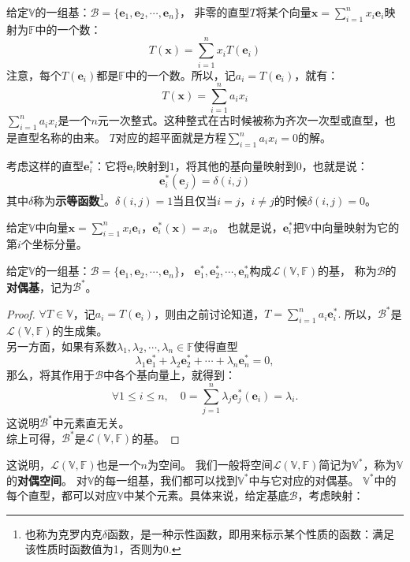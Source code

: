 \documentclass[12pt,UTF8,fontset=none]{ctexbook}
\begin{document}
给定$\mathbb{V}$的一组基：$\mathcal{B} = \{\mathbf{e}_1, \mathbf{e}_2, \cdots, \mathbf{e}_{n}\}$，
非零的直型$T$将某个向量$\mathbf{x} = \sum_{i=1}^n x_i \mathbf{e}_i$映射为$\mathbb{F}$中的一个数：
$$ T(\mathbf{x}) = \sum_{i=1}^n x_i T(\mathbf{e}_i)$$
注意，每个$T(\mathbf{e}_i)$都是$\mathbb{F}$中的一个数。所以，记$a_i = T(\mathbf{e}_i)$，就有：
$$ T(\mathbf{x}) = \sum_{i=1}^n a_i x_i$$
$\sum_{i=1}^n a_i x_i$是一个$n$元一次整式。这种整式在古时候被称为齐次一次型或直型，也是直型名称的由来。
$T$对应的超平面就是方程$ \sum_{i=1}^n a_i x_i = 0$的解。

考虑这样的直型$\mathbf{e}_i^*$：它将$\mathbf{e}_i$映射到$1$，将其他的基向量映射到$0$，也就是说：
$$ \mathbf{e}_i^*(\mathbf{e}_j) = \delta(i,j) $$
其中$\delta$称为\textbf{示等函数}\footnote{也称为克罗内克$\delta$函数，是一种示性函数，即用来标示某个性质的函数：满足该性质时函数值为1，否则为0.}。$\delta(i,j)=1$当且仅当$i=j$，$i\neq j$的时候$\delta(i,j)=0$。

给定$\mathbb{V}$中向量$\mathbf{x} = \sum_{i=1}^n x_i \mathbf{e}_i$，$\mathbf{e}_i^*(\mathbf{x}) = x_i$。
也就是说，$\mathbf{e}_i^*$把$\mathbb{V}$中向量映射为它的第$i$个坐标分量。

\begin{pp}\label{pp:3_5_1}
给定$\mathbb{V}$的一组基：$\mathcal{B} = \{\mathbf{e}_1, \mathbf{e}_2, \cdots, \mathbf{e}_{n}\}$，
$\mathbf{e}_1^*, \mathbf{e}_2^*, \cdots , \mathbf{e}_n^*$构成$\mathcal{L}(\mathbb{V}, \mathbb{F})$的基，
称为$\mathcal{B}$的\textbf{对偶基}，记为$\mathcal{B}^*$。
\end{pp}
\begin{proof} %
$\forall T \in \mathbb{V}$，记$a_i = T(\mathbf{e}_i)$，则由之前讨论知道，$T = \sum_{i=1}^n a_i \mathbf{e}_i^*.$ 
所以，$\mathcal{B}^*$是$\mathcal{L}(\mathbb{V}, \mathbb{F})$的生成集。\\
另一方面，如果有系数$\lambda_1, \lambda_2, \cdots, \lambda_n \in \mathbb{F}$使得直型
$$ \lambda_1 \mathbf{e}_1^* + \lambda_2 \mathbf{e}_2^* + \cdots + \lambda_n \mathbf{e}_n^* = 0,$$
那么，将其作用于$\mathcal{B}$中各个基向量上，就得到：
$$ \forall 1 \leqslant i \leqslant n, \quad 0 = \sum_{j=1}^n \lambda_j \mathbf{e}_j^*(\mathbf{e}_i) = \lambda_i.$$
这说明$\mathcal{B}^*$中元素直无关。\\
综上可得，$\mathcal{B}^*$是$\mathcal{L}(\mathbb{V}, \mathbb{F})$的基。
\end{proof}


这说明，$\mathcal{L}(\mathbb{V}, \mathbb{F})$也是一个$n$为空间。
我们一般将空间$\mathcal{L}(\mathbb{V}, \mathbb{F})$简记为$\mathbb{V}^*$，称为$\mathbb{V}$的\textbf{对偶空间}。
对$\mathbb{V}$的每一组基，我们都可以找到$\mathbb{V}^*$中与它对应的对偶基。
$\mathbb{V}^*$中的每个直型，都可以对应$\mathbb{V}$中某个元素。具体来说，给定基底$\mathcal{B}$，考虑映射：
\end{document}
